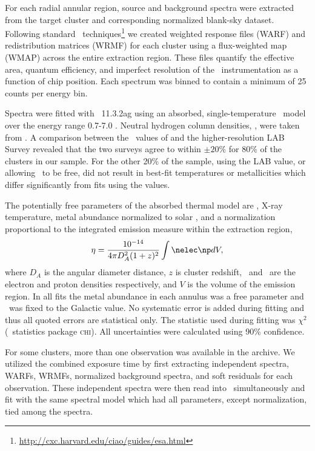 \documentclass[apj]{emulateapj}
\begin{document}
For each radial annular region, source and background spectra were
extracted from the target cluster and corresponding normalized
blank-sky dataset. Following standard
\ciao\ techniques\footnote{\url{http://cxc.harvard.edu/ciao/guides/esa.html}}
we created weighted response files (WARF) and redistribution matrices
(WRMF) for each cluster using a flux-weighted map (WMAP) across the
entire extraction region. These files quantify the effective area,
quantum efficiency, and imperfect resolution of the
\chandra\ instrumentation as a function of chip position. Each
spectrum was binned to contain a minimum of 25 counts per energy bin.

Spectra were fitted with \xspec\ 11.3.2ag \citep{xspec} using an
absorbed, single-temperature \mekal\ model \citep{mekal1, mekal2} over
the energy range 0.7-7.0 \keV. Neutral hydrogen column densities,
\nhi, were taken from \citet{dickeylockman}. A comparison between the
\nhi\ values of \citet{dickeylockman} and the higher-resolution LAB
Survey \citep{lab} revealed that the two surveys agree to within $\pm
20\%$ for 80\% of the clusters in our sample. For the other 20\% of
the sample, using the LAB value, or allowing \nhi\ to be free, did not
result in best-fit temperatures or metallicities which differ
significantly from fits using the \citet{dickeylockman} values.

The potentially free parameters of the absorbed thermal model are
\nhi, X-ray temperature, metal abundance normalized to solar
\citep[elemental ratios taken from]{ag89}, and a normalization
proportional to the integrated emission measure within the extraction
region,
\begin{equation}
\label{eqn:norm}
\eta = \frac{10^{-14}}{4\pi D_A^2(1+z)^2}\int \nelec \np dV,
\end{equation}
where $D_A$ is the angular diameter distance, $z$ is cluster redshift,
\nelec\ and \np\ are the electron and proton densities respectively,
and $V$ is the volume of the emission region. In all fits the metal
abundance in each annulus was a free parameter and \nhi\ was fixed to
the Galactic value. No systematic error is added during fitting and
thus all quoted errors are statistical only. The statistic used during
fitting was $\chi^2$ (\xspec\ statistics package \textsc{chi}). All
uncertainties were calculated using 90\% confidence.

For some clusters, more than one observation was available in the
archive. We utilized the combined exposure time by first extracting
independent spectra, WARFs, WRMFs, normalized background spectra, and
soft residuals for each observation. These independent spectra were
then read into \xspec\ simultaneously and fit with the same spectral
model which had all parameters, except normalization, tied among the
spectra.
\end{document}
